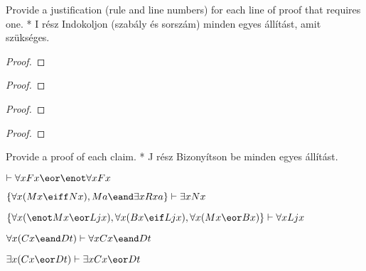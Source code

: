 \newpage
\solutions
\problempart
\label{pr.justifyQLproof}
Provide a justification (rule and line numbers) for each line of proof that requires one.
* I rész Indokoljon (szabály és sorszám) minden egyes állítást, amit szükséges.
\begin{multicols}{2}
\begin{proof}
	\open
	\close
{} {}
\end{proof}

\begin{proof}
 {}
 {}
\end{proof}


\begin{proof}
\open
\close
{}
\end{proof}





\begin{proof}
	\open
	\close
{} {}
\end{proof}
\end{multicols}

\solutions
\problempart
\label{pr.someQLproofs}
Provide a proof of each claim.
* J rész Bizonyítson be minden egyes állítást.
\begin{earg}
\item $\vdash \forall x Fx \eor \enot \forall x Fx$
\item $\{\forall x(Mx \eiff Nx), Ma\eand\exists x Rxa\}\vdash \exists x Nx$
\item $\{\forall x(\enot Mx \eor Ljx), \forall x(Bx\eif Ljx), \forall x(Mx\eor Bx)\}\vdash \forall xLjx$
\item $\forall x(Cx \eand Dt)\vdash \forall xCx \eand Dt$
\item $\exists x(Cx \eor Dt)\vdash \exists x Cx \eor Dt$
\end{earg}

